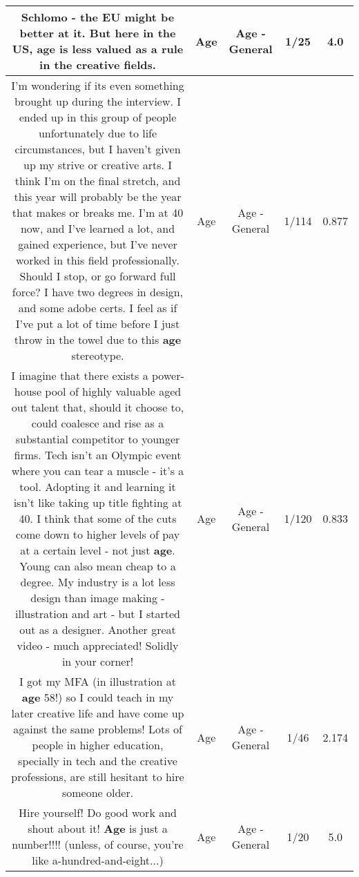 \documentclass[11pt]{article}
\newlength\mylength
\begin{document}
\begin{center}
\begin{longtable}{|C{.65\mylength}|C{.30\mylength}|C{.12\mylength}|C{.12\mylength}|C{.12\mylength}|}
  \small Schlomo - the EU might be better at it. But here in the US, \textbf{age} is less valued as a rule in the creative fields.\normalsize   & Age & Age - General & 1/25 & 4.0 \\  \hline
  \small I'm wondering if its even something brought up during the interview. I ended up in this group of people unfortunately due to life circumstances, but I haven't given up my strive or creative arts. I think I'm on the final stretch, and this year will probably be the year that makes or breaks me. I'm at 40 now, and I've learned a lot, and gained experience, but I've never worked in this field professionally. Should I stop, or go forward full force? I have two degrees in design, and some adobe certs. I feel as if I've put a lot of time before I just throw in the towel due to this \textbf{age} stereotype.\normalsize   & Age & Age - General & 1/114 & 0.877 \\  \hline
  \small I imagine that there exists a power-house pool of highly valuable aged out talent that, should it choose to, could coalesce and rise as a substantial competitor to younger firms. Tech isn't an Olympic event where you can tear a muscle - it's a tool. Adopting it and learning it isn't like taking up title fighting at 40. I think that some of the cuts come down to higher levels of pay at a certain level - not just \textbf{age}. Young can also mean cheap to a degree. My industry is a lot less design than image making - illustration and art - but I started out as a designer. Another great video - much appreciated! Solidly in your corner!\normalsize   & Age & Age - General & 1/120 & 0.833 \\  \hline
  \small I got my MFA (in illustration at \textbf{age} 58!) so I could teach in my later creative life and have come up against the same problems!  Lots of people in higher education, specially in tech and the creative professions, are still hesitant to hire someone older.\normalsize   & Age & Age - General & 1/46 & 2.174 \\  \hline
  \small Hire yourself! Do good work and shout about it! \textbf{Age} is just a number!!!! (unless, of course, you're like a-hundred-and-eight...)\normalsize   & Age & Age - General & 1/20 & 5.0 \\  \hline
  
\end{longtable}
\end{center}
\end{document}
